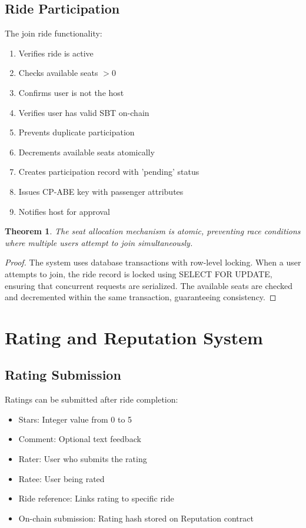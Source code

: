 \documentclass[12pt]{report}
\theoremstyle{plain}
\newtheorem{theorem}{Theorem}[section]
\theoremstyle{definition}
\theoremstyle{remark}
\begin{document}
\subsection{Ride Participation}

The join ride functionality:

\begin{enumerate}
    \item Verifies ride is active
    \item Checks available seats $> 0$
    \item Confirms user is not the host
    \item Verifies user has valid SBT on-chain
    \item Prevents duplicate participation
    \item Decrements available seats atomically
    \item Creates participation record with 'pending' status
    \item Issues CP-ABE key with passenger attributes
    \item Notifies host for approval
\end{enumerate}

\begin{theorem}
The seat allocation mechanism is atomic, preventing race conditions where multiple users attempt to join simultaneously.
\end{theorem}

\begin{proof}
The system uses database transactions with row-level locking. When a user attempts to join, the ride record is locked using SELECT FOR UPDATE, ensuring that concurrent requests are serialized. The available seats are checked and decremented within the same transaction, guaranteeing consistency.
\end{proof}

\section{Rating and Reputation System}

\subsection{Rating Submission}

Ratings can be submitted after ride completion:

\begin{itemize}
    \item Stars: Integer value from 0 to 5
    \item Comment: Optional text feedback
    \item Rater: User who submits the rating
    \item Ratee: User being rated
    \item Ride reference: Links rating to specific ride
    \item On-chain submission: Rating hash stored on Reputation contract
\end{itemize}
\end{document}
